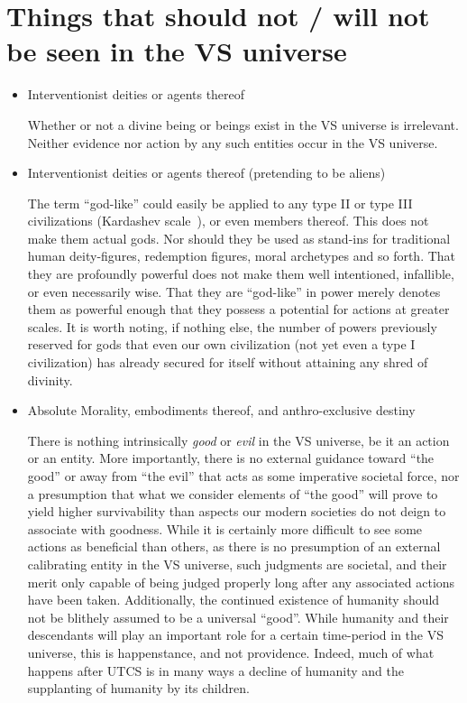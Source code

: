 \label{chapt:overview}
\section{Things that should not / will not be seen in the VS universe}
\begin{itemize}

\item Interventionist deities or agents thereof

Whether or not a divine being or beings exist in the VS universe is
irrelevant. Neither evidence nor action by any such entities occur in
the VS universe.

\item Interventionist deities or agents thereof (pretending to be aliens)

The term ``god-like'' could easily be applied to any type II or type
III civilizations (Kardashev scale~\cite{Kardashev}), or even members
thereof. This does not make them actual gods. Nor should they be used
as stand-ins for traditional human deity-figures, redemption figures,
moral archetypes and so forth. That they are profoundly powerful does
not make them well intentioned, infallible, or even necessarily
wise. That they are ``god-like'' in power merely denotes them as
powerful enough that they possess a potential for actions at greater
scales. It is worth noting, if nothing else, the number of powers
previously reserved for gods that even our own civilization (not yet
even a type I civilization) has already secured for itself without attaining
any shred of divinity.

\item Absolute Morality, embodiments thereof, and anthro-exclusive destiny

There is nothing intrinsically {\em good} or {\em evil} in the VS
universe, be it an action or an entity. More importantly, there is no
external guidance toward ``the good'' or away from ``the evil'' that
acts as some imperative societal force, nor a presumption that what we
consider elements of ``the good'' will prove to yield higher
survivability than aspects our modern societies do not deign to
associate with goodness. While it is certainly more difficult to see
some actions as beneficial than others, as there is no presumption of
an external calibrating entity in the VS universe, such judgments are
societal, and their merit only capable of being judged properly long
after any associated actions have been taken. Additionally, the
continued existence of humanity should not be blithely assumed to be a
universal ``good''. While humanity and their descendants will play an
important role for a certain time-period in the VS universe, this is
happenstance, and not providence. Indeed, much of what happens after
UTCS is in many ways a decline of humanity and the supplanting of
humanity by its children.


\end{itemize}
